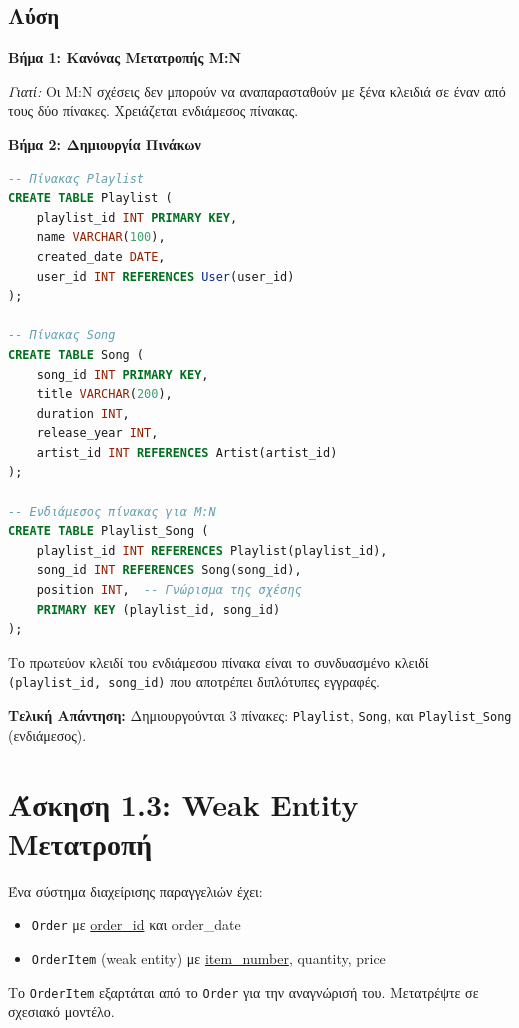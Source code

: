 \subsection*{Λύση}

\textbf{Βήμα 1: Κανόνας Μετατροπής M:N}

\textit{Γιατί:} Οι M:N σχέσεις δεν μπορούν να αναπαρασταθούν με ξένα κλειδιά σε έναν
από τους δύο πίνακες. Χρειάζεται ενδιάμεσος πίνακας.

\textbf{Βήμα 2: Δημιουργία Πινάκων}

\begin{lstlisting}[language=SQL]
-- Πίνακας Playlist
CREATE TABLE Playlist (
    playlist_id INT PRIMARY KEY,
    name VARCHAR(100),
    created_date DATE,
    user_id INT REFERENCES User(user_id)
);

-- Πίνακας Song
CREATE TABLE Song (
    song_id INT PRIMARY KEY,
    title VARCHAR(200),
    duration INT,
    release_year INT,
    artist_id INT REFERENCES Artist(artist_id)
);

-- Ενδιάμεσος πίνακας για M:N
CREATE TABLE Playlist_Song (
    playlist_id INT REFERENCES Playlist(playlist_id),
    song_id INT REFERENCES Song(song_id),
    position INT,  -- Γνώρισμα της σχέσης
    PRIMARY KEY (playlist_id, song_id)
);
\end{lstlisting}

\begin{infobox}[Σημαντικό]
Το πρωτεύον κλειδί του ενδιάμεσου πίνακα είναι το συνδυασμένο κλειδί
\texttt{(playlist\_id, song\_id)} που αποτρέπει διπλότυπες εγγραφές.
\end{infobox}

\textbf{Τελική Απάντηση:} Δημιουργούνται 3 πίνακες: \texttt{Playlist}, \texttt{Song},
και \texttt{Playlist\_Song} (ενδιάμεσος).

\section{Άσκηση 1.3: Weak Entity Μετατροπή}

\begin{formulabox}[Εκφώνηση]
Ένα σύστημα διαχείρισης παραγγελιών έχει:
\begin{itemize}
    \item \texttt{Order} με \underline{order\_id} και order\_date
    \item \texttt{OrderItem} (weak entity) με \underline{item\_number}, quantity, price
\end{itemize}
Το \texttt{OrderItem} εξαρτάται από το \texttt{Order} για την αναγνώρισή του.
Μετατρέψτε σε σχεσιακό μοντέλο.
\end{formulabox}

